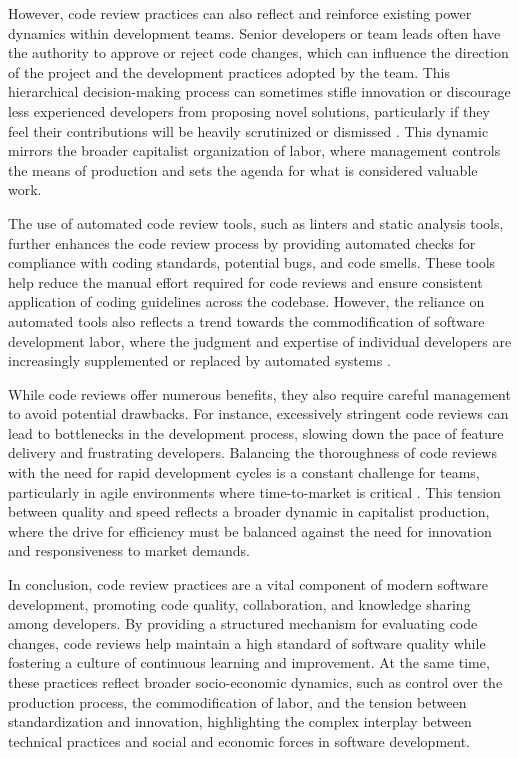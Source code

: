 \begin{refsection}
However, code review practices can also reflect and reinforce existing power dynamics within development teams. Senior developers or team leads often have the authority to approve or reject code changes, which can influence the direction of the project and the development practices adopted by the team. This hierarchical decision-making process can sometimes stifle innovation or discourage less experienced developers from proposing novel solutions, particularly if they feel their contributions will be heavily scrutinized or dismissed \cite[pp.~76-79]{Fowler1999}. This dynamic mirrors the broader capitalist organization of labor, where management controls the means of production and sets the agenda for what is considered valuable work.

The use of automated code review tools, such as linters and static analysis tools, further enhances the code review process by providing automated checks for compliance with coding standards, potential bugs, and code smells. These tools help reduce the manual effort required for code reviews and ensure consistent application of coding guidelines across the codebase. However, the reliance on automated tools also reflects a trend towards the commodification of software development labor, where the judgment and expertise of individual developers are increasingly supplemented or replaced by automated systems \cite[pp.~190-193]{McConnell2004}.

While code reviews offer numerous benefits, they also require careful management to avoid potential drawbacks. For instance, excessively stringent code reviews can lead to bottlenecks in the development process, slowing down the pace of feature delivery and frustrating developers. Balancing the thoroughness of code reviews with the need for rapid development cycles is a constant challenge for teams, particularly in agile environments where time-to-market is critical \cite[pp.~304-306]{Sommerville2016}. This tension between quality and speed reflects a broader dynamic in capitalist production, where the drive for efficiency must be balanced against the need for innovation and responsiveness to market demands.

In conclusion, code review practices are a vital component of modern software development, promoting code quality, collaboration, and knowledge sharing among developers. By providing a structured mechanism for evaluating code changes, code reviews help maintain a high standard of software quality while fostering a culture of continuous learning and improvement. At the same time, these practices reflect broader socio-economic dynamics, such as control over the production process, the commodification of labor, and the tension between standardization and innovation, highlighting the complex interplay between technical practices and social and economic forces in software development.


\end{refsection}

